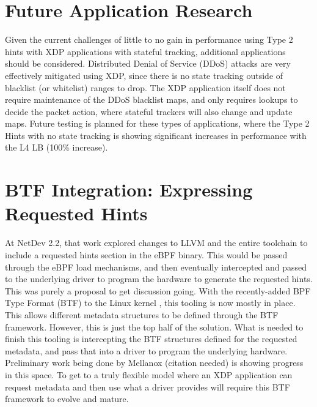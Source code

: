 \documentclass[letterpaper]{article}
\begin{document}
\section{Future Application Research}
Given the current challenges of little to no gain in performance using Type 2 hints with XDP applications with stateful tracking, additional applications should be considered.  Distributed Denial of Service (DDoS) attacks are very effectively mitigated using XDP, since there is no state tracking outside of blacklist (or whitelist) ranges to drop.  The XDP application itself does not require maintenance of the DDoS blacklist maps, and only requires lookups to decide the packet action, where stateful trackers will also change and update maps.
\newline
\newline
Future testing is planned for these types of applications, where the Type 2 Hints with no state tracking is showing significant increases in performance with the L4 LB (100\% increase).

\section{BTF Integration: Expressing Requested Hints}
At NetDev 2.2, that work explored changes to LLVM and the entire toolchain to include a requested hints section in the eBPF binary.  This would be passed through the eBPF load mechanisms, and then eventually intercepted and passed to the underlying driver to program the hardware to generate the requested hints.  This was purely a proposal to get discussion going.
\newline
\newline
With the recently-added BPF Type Format (BTF) to the Linux kernel \cite{btf-patches-2018}, this tooling is now mostly in place.  This allows different metadata structures to be defined through the BTF framework.  However, this is just the top half of the solution.
\newline
\newline
What is needed to finish this tooling is intercepting the BTF structures defined for the requested metadata, and pass that into a driver to program the underlying hardware.  Preliminary work being done by Mellanox (citation needed) is showing progress in this space.  To get to a truly flexible model where an XDP application can request metadata and then use what a driver provides will require this BTF framework to evolve and mature.
\end{document}
